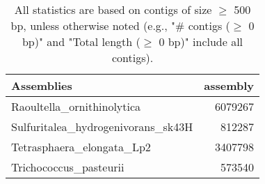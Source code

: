 \documentclass[12pt,a4paper]{article}
\begin{document}
\begin{table}[ht]
\begin{center}
\caption{All statistics are based on contigs of size $\geq$ 500 bp, unless otherwise noted (e.g., "\# contigs ($\geq$ 0 bp)" and "Total length ($\geq$ 0 bp)" include all contigs).}
\begin{tabular}{|l*{1}{|r}|}
\hline
Assemblies & assembly \\ \hline
Raoultella\_ornithinolytica & 6079267 \\ \hline
Sulfuritalea\_hydrogenivorans\_sk43H & 812287 \\ \hline
Tetrasphaera\_elongata\_Lp2 & 3407798 \\ \hline
Trichococcus\_pasteurii & 573540 \\ \hline
\end{tabular}
\end{center}
\end{table}
\end{document}
